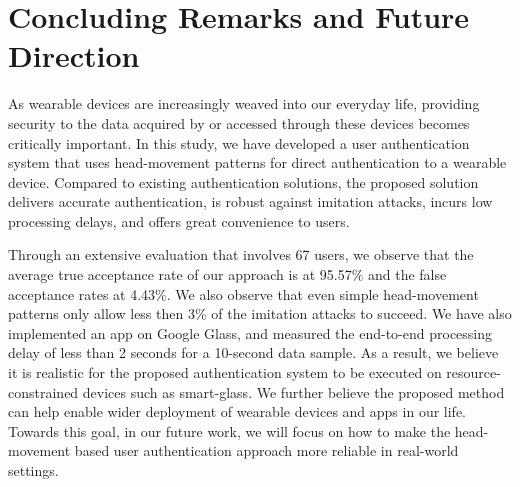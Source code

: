 \section{Concluding Remarks and Future Direction}
\label{sec:conc}
As wearable devices are increasingly weaved into our everyday life, providing security to the data acquired by or accessed through these devices becomes critically important. In this study, we have developed a user authentication system that uses head-movement patterns for direct
authentication to a wearable device. Compared to existing authentication solutions, the proposed solution delivers accurate authentication, is robust against imitation attacks, incurs low processing delays, and offers great convenience to users. 

Through an extensive evaluation that involves 67 users, we observe that the
average true acceptance rate of our approach is at 95.57$\%$ and the false
acceptance rates at 4.43$\%$. We also observe that even simple head-movement patterns only allow less then 3\% of the imitation attacks to succeed. We have also implemented an app on Google Glass, and measured the end-to-end processing delay of less than 2 seconds for a 10-second data sample. As a result, we believe it is realistic for the proposed authentication system to be executed on resource-constrained devices such as smart-glass. We further believe the proposed method can help enable wider deployment of wearable devices and apps in our life. Towards this goal, in our future work, we will focus on how to make the head-movement based user authentication approach more reliable in real-world settings.

